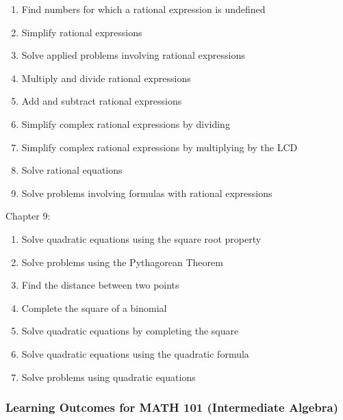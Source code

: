 \documentclass[11pt]{article}
\newenvironment{alphalist}{
\begin{enumerate}[label=(\arabic*),widest=107 ,leftmargin=25pt, itemsep=0pt]}
{\end{enumerate}}
\begin{document}
 \begin{alphalist}
    \item Find numbers for which a rational expression is undefined
    \item Simplify rational expressions
    \item Solve applied problems involving rational expressions
    \item Multiply and divide rational expressions
    \item Add and subtract rational expressions
    \item Simplify complex rational expressions by dividing
    \item Simplify complex rational expressions by multiplying by the LCD
    \item Solve rational equations
    \item Solve problems involving formulas with rational expressions
 \end{alphalist}
\noindent Chapter 9:
 \begin{alphalist}
    \item Solve quadratic equations using the square root property
    \item Solve problems using the Pythagorean Theorem
    \item Find the distance between two points
    \item Complete the square of a binomial
    \item Solve quadratic equations by completing the square
    \item Solve quadratic equations using the quadratic formula
    \item Solve problems using quadratic equations
 \end{alphalist}

\subsubsection*{Learning Outcomes for MATH 101 (Intermediate Algebra)}
\end{document}

